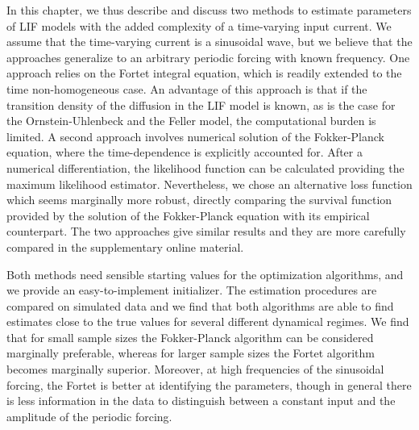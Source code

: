 In this chapter, we thus describe and discuss two methods to estimate parameters
of LIF models with the added complexity of a time-varying input current. We
assume that the time-varying current is a sinusoidal wave, but we believe that
the approaches generalize to an arbitrary periodic forcing with known frequency.
One approach relies on the Fortet integral equation, which is readily extended
to the time non-homogeneous case. An advantage of this approach is that if the
transition density of the diffusion in the LIF model is known, as is the case
for the Ornstein-Uhlenbeck and the Feller model, the computational burden is
limited. A second approach involves numerical solution of the Fokker-Planck
equation, where the time-dependence is explicitly accounted for. After a
numerical differentiation, the likelihood function can be calculated providing
the maximum likelihood estimator. Nevertheless, we chose an alternative loss
function which seems marginally more robust, directly comparing the survival
function provided by the solution of the Fokker-Planck equation with its
empirical counterpart. The two approaches give similar results and they are more
carefully compared in the supplementary online material.

Both methods need sensible starting values for the optimization
algorithms, and we provide an easy-to-implement initializer. The estimation
procedures are compared on simulated data and we find that both algorithms are
able to find estimates close to the true values for several different dynamical
regimes. We find that for small sample sizes the Fokker-Planck algorithm can be
considered marginally preferable, whereas for larger sample sizes the Fortet
algorithm becomes marginally superior. Moreover, at high frequencies of the
sinusoidal forcing, the Fortet is better at identifying the parameters, though in general
there is less information in the data to distinguish between a constant input
and the amplitude of the periodic forcing.

